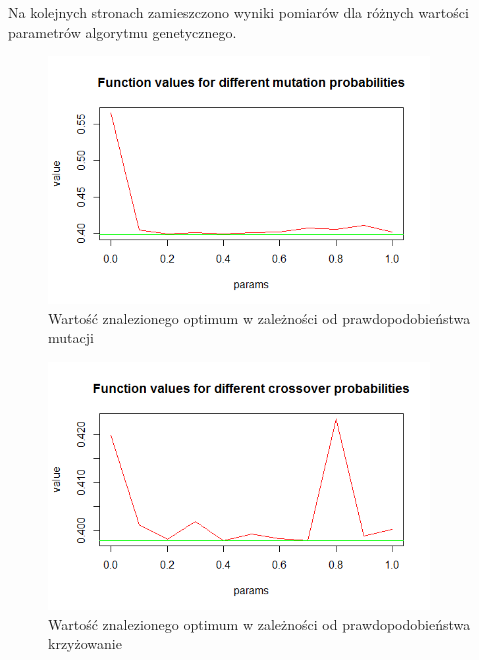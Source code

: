 \documentclass[11pt, a4paper]{article}
\newcommand{\fbi}{\leavevmode{\parindent=1em\indent}}
\begin{document}
\fbi
Na kolejnych stronach zamieszczono wyniki pomiarów dla różnych wartości parametrów algorytmu genetycznego.

\begin{figure}[H]
	\begin{center}
		\includegraphics[width=0.9\textwidth]{./assets/branin2.png} %
		\caption{Wartość znalezionego optimum w zależności od prawdopodobieństwa mutacji}
		\label{fig:branin2}
	\end{center}
\end{figure}

\begin{figure}[H]
	\begin{center}
		\includegraphics[width=0.9\textwidth]{./assets/branin3.png} %
		\caption{Wartość znalezionego optimum w zależności od prawdopodobieństwa krzyżowanie}
		\label{fig:branin3}
	\end{center}
\end{figure}
\end{document}
